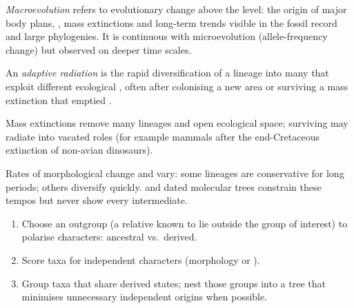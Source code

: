 \begin{definition}[Macroevolution]\label{def:g12:phylogeny-macroevolution:macroevolution}
\emph{Macroevolution} refers to evolutionary
change above the  level: the origin of major body plans,
, mass extinctions and long-term trends visible in
the fossil record and large phylogenies. It is continuous with
microevolution (allele-frequency change) but observed on deeper time
scales.
\end{definition}

\begin{definition}
\label{def:g12:phylogeny-macroevolution:radiation}
An \emph{adaptive radiation} is the rapid
diversification of a lineage into many  that exploit different
ecological , often after colonising a new area or surviving a mass
extinction that emptied .
\end{definition}

\begin{proposition}
\label{prop:g12:phylogeny-macroevolution:extinction}
Mass extinctions remove many lineages and open ecological space;
surviving  may radiate into vacated roles (for example mammals
after the end-Cretaceous extinction of non-avian dinosaurs).
\end{proposition}
\admitted

\begin{remark}[Tempo]\label{rem:g12:phylogeny-macroevolution:tempo}
Rates of morphological change and  vary: some lineages are
conservative for long periods; others diversify quickly.  and
dated molecular trees constrain these tempos but never show every
intermediate.
\end{remark}

\begin{method}
\label{met:g12:phylogeny-macroevolution:characters}
\begin{enumerate}
  \item Choose an outgroup (a relative known to lie outside the group
        of interest) to polarise characters: ancestral vs.\ derived.
  \item Score taxa for independent characters (morphology or ).
  \item Group taxa that share derived states; nest those groups into a
        tree that minimises unnecessary independent origins when
        possible.
\end{enumerate}
\end{method}

